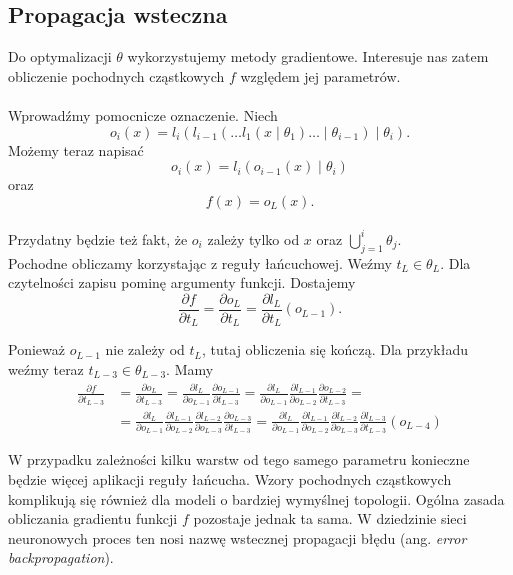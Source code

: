 
\subsection{Propagacja wsteczna}
Do optymalizacji $\theta$ wykorzystujemy metody gradientowe. Interesuje nas zatem obliczenie pochodnych cząstkowych $f$ względem jej parametrów.
\\\\
Wprowadźmy pomocnicze oznaczenie. Niech
\[o_i(x) = l_i(l_{i-1}(\dots l_1(x \mid \theta_1) \dots \mid \theta_{i-1}) \mid \theta_i).\]
Możemy teraz napisać
\[o_i(x) = l_i(o_{i-1}(x) \mid \theta_i)\]
oraz
\[f(x) = o_L(x).\]
\\
Przydatny będzie też fakt, że $o_i$ zależy tylko od $x$ oraz $\bigcup_{j=1}^i \theta_j$.
\\

Pochodne obliczamy korzystając z reguły łańcuchowej. Weźmy $t_L \in \theta_L$. Dla czytelności zapisu pominę argumenty funkcji. Dostajemy
\[\frac{\partial f}{\partial t_L} = \frac{\partial o_L}{\partial t_L} = \frac{\partial l_L}{\partial t_L}(o_{L-1}).\]

Ponieważ $o_{L-1}$ nie zależy od $t_L$, tutaj obliczenia się kończą. Dla przykładu weźmy teraz $t_{L-3} \in \theta_{L-3}$. Mamy
\[
\begin{aligned}
    \frac{\partial f}{\partial t_{L-3}} &= \frac{\partial o_L}{\partial t_{L-3}} = \frac{\partial l_L}{\partial o_{L-1}} \frac{\partial o_{L-1}}{\partial t_{L-3}} = \frac{\partial l_L}{\partial o_{L-1}} \frac{\partial l_{L-1}}{\partial o_{L-2}} \frac{\partial o_{L-2}}{\partial t_{L-3}} = \\[10pt]
    &= \frac{\partial l_L}{\partial o_{L-1}} \frac{\partial l_{L-1}}{\partial o_{L-2}} \frac{\partial l_{L-2}}{\partial o_{L-3}} \frac{\partial o_{L-3}}{\partial t_{L-3}}
    = \frac{\partial l_L}{\partial o_{L-1}} \frac{\partial l_{L-1}}{\partial o_{L-2}} \frac{\partial l_{L-2}}{\partial o_{L-3}} \frac{\partial l_{L-3}}{\partial t_{L-3}}(o_{L-4})
\end{aligned}
\]

W przypadku zależności kilku warstw od tego samego parametru konieczne będzie więcej aplikacji reguły łańcucha. Wzory pochodnych cząstkowych komplikują się również dla modeli o bardziej wymyślnej topologii. Ogólna zasada obliczania gradientu funkcji $f$ pozostaje jednak ta sama. W dziedzinie sieci neuronowych proces ten nosi nazwę wstecznej propagacji błędu (ang. \textit{error backpropagation}).\\

